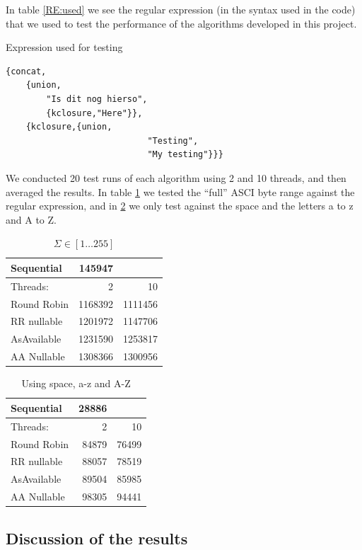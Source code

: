 \documentclass[a4paper,11pt]{report}
\begin{document}
In table \ref{RE:used} we see the regular expression (in the syntax
used in the code) that we used to test the performance of the
algorithms developed in this project. 

\begin{table}
\caption{Expression used for testing}
\label{RE:used}
\begin{verbatim} 
{concat,
	{union,
		"Is dit nog hierso",
		{kclosure,"Here"}},
	{kclosure,{union,
							"Testing",
							"My testing"}}}
\end{verbatim}
\end{table}

We conducted 20 test runs of each algorithm using 2 and 10 threads,
and then averaged the results.  In table \ref{test255} we tested the
``full'' ASCI byte range against the regular expression, and in
\ref{testexp} we only test against the space and the letters a to z
and A to Z.
 
\begin{table}
\caption{$\Sigma\in [1\ldots255]$}
\label{test255}
\begin{tabular}[h]{|l|r|r|}
	Sequential &145947&\\\hline
	Threads:&2&10\\\hline
	Round Robin &1168392 & 1111456 \\
	RR nullable &1201972 &1147706 \\
	AsAvailable & 1231590& 1253817\\
	AA Nullable & 1308366 &1300956 \\
\end{tabular}
\end{table}

\begin{table}
\label{testexp}
\caption{Using space, a-z and A-Z}

\begin{tabular}[h]{|l|r|r|}
	Sequential &28886&\\\hline
	Threads:&2&10\\\hline
	Round Robin &84879 & 76499 \\
	RR nullable &88057 &78519 \\
	AsAvailable & 89504& 85985\\
	AA Nullable & 98305 &94441 \\
\end{tabular}
\end{table}

\subsection{Discussion of the results}
\label{sec:discresults}
\end{document}
